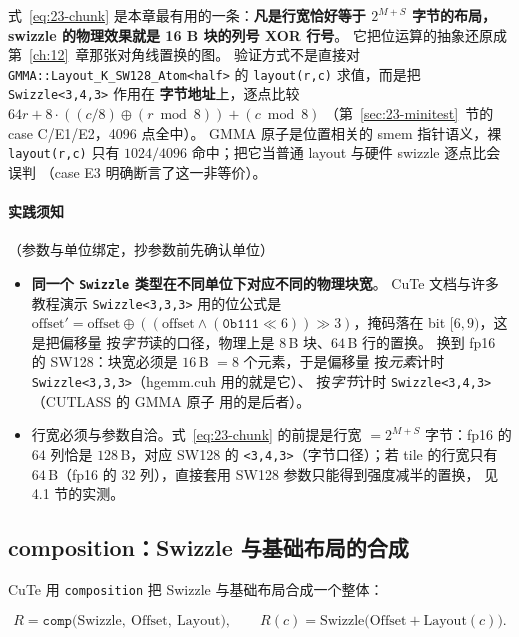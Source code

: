 式~\eqref{eq:23-chunk} 是本章最有用的一条：\textbf{凡是行宽恰好等于
$2^{M+S}$ 字节的布局，swizzle 的物理效果就是 16 B 块的列号 XOR 行号}。
它把位运算的抽象还原成第~\ref{ch:12}~章那张对角线置换的图。
验证方式不是直接对 \texttt{GMMA::\allowbreak{}Layout\_\allowbreak{}K\_\allowbreak{}SW128\_\allowbreak{}Atom\allowbreak{}<half>}
的 \texttt{layout(r,c)} 求值，而是把 \texttt{Swizzle<3,4,3>} 作用在
\textbf{字节地址}上，逐点比较
$64r+8\cdot((c/8)\oplus(r\bmod 8))+(c\bmod 8)$
（第~\ref{sec:23-minitest}~节的 case C/E1/E2，4096 点全中）。
GMMA 原子是位置相关的 smem 指针语义，裸 \texttt{layout(r,c)} 只有
$1024/4096$ 命中；把它当普通 layout 与硬件 swizzle 逐点比会误判
（case E3 明确断言了这一非等价）。

\paragraph{实践须知}（参数与单位绑定，抄参数前先确认单位）
\begin{itemize}
  \item \textbf{同一个 \texttt{Swizzle} 类型在不同单位下对应不同的物理块宽}。
        CuTe 文档与许多教程演示 \texttt{Swizzle\allowbreak{}<3,\allowbreak{}3,\allowbreak{}3>} 用的位公式是
        $\text{offset}'=\text{offset}\oplus((\text{offset}\wedge
        (\texttt{0b111}\ll6))\gg3)$，掩码落在 bit $[6,9)$，这是把偏移量
        按\emph{字节}读的口径，物理上是 $8$\,B 块、$64$\,B 行的置换。
        换到 fp16 的 SW128：块宽必须是 $16$\,B $=8$ 个元素，于是偏移量
        按\emph{元素}计时 \texttt{Swizzle\allowbreak{}<3,\allowbreak{}3,\allowbreak{}3>}（hgemm.cuh 用的就是它）、
        按\emph{字节}计时 \texttt{Swizzle\allowbreak{}<3,\allowbreak{}4,\allowbreak{}3>}（CUTLASS 的 GMMA 原子
        用的是后者）。
  \item 行宽必须与参数自洽。式~\eqref{eq:23-chunk} 的前提是行宽
        $=2^{M+S}$ 字节：fp16 的 $64$ 列恰是 $128$\,B，对应 SW128 的
        \texttt{<3,4,3>}（字节口径）；若 tile 的行宽只有 $64$\,B（fp16 的
        $32$ 列），直接套用 SW128 参数只能得到强度减半的置换，
        见 4.1 节的实测。
\end{itemize}

\subsection{composition：Swizzle 与基础布局的合成}

CuTe 用 \texttt{composition} 把 Swizzle 与基础布局合成一个整体：

\begin{equation}
\label{eq:23-comp}
R = \texttt{comp}\big(\text{Swizzle},\ \text{Offset},\ \text{Layout}\big),
\qquad R(c) = \text{Swizzle}\Big(\text{Offset} + \text{Layout}(c)\Big).
\end{equation}


